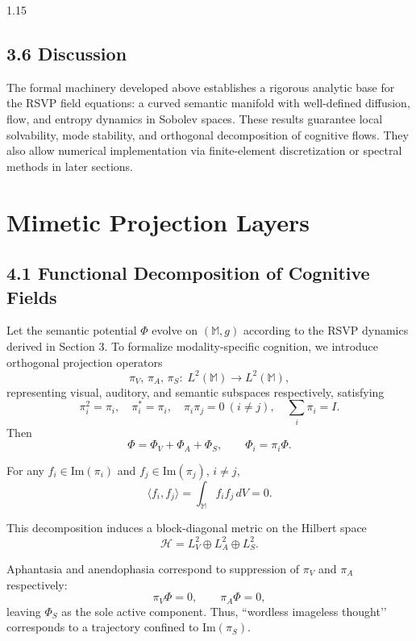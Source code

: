 \documentclass[12pt,a4paper]{article}
\begin{document}
\begin{spacing}{1.15}
\subsection{3.6 Discussion}

The formal machinery developed above establishes a rigorous analytic base for the RSVP field equations:
a curved semantic manifold with well-defined diffusion, flow, and entropy dynamics in Sobolev spaces.
These results guarantee local solvability, mode stability, and orthogonal decomposition of cognitive flows.
They also allow numerical implementation via finite-element discretization or spectral methods in later sections.

\section{Mimetic Projection Layers}

\subsection{4.1 Functional Decomposition of Cognitive Fields}

Let the semantic potential $\Phi$ evolve on $(\mathbb{M},g)$ according to the RSVP dynamics derived in Section 3.  
To formalize modality-specific cognition, we introduce orthogonal projection operators
\[
\pi_V,\,\pi_A,\,\pi_S:\;L^2(\mathbb{M})\rightarrow L^2(\mathbb{M}),
\]
representing visual, auditory, and semantic subspaces respectively, satisfying
\[
\pi_i^2=\pi_i,\quad
\pi_i^\ast=\pi_i,\quad
\pi_i\pi_j=0\ (i\neq j),\quad
\sum_i\pi_i=I.
\]
Then
\begin{equation}
\Phi=\Phi_V+\Phi_A+\Phi_S,\qquad
\Phi_i=\pi_i\Phi.
\label{eq:Phi-decomp}
\end{equation}

\begin{definition}
For any $f_i\in\mathrm{Im}(\pi_i)$ and $f_j\in\mathrm{Im}(\pi_j)$, $i\neq j$,
\[
\langle f_i,f_j\rangle=\int_\mathbb{M}f_i f_j\,dV=0.
\]
\end{definition}

This decomposition induces a block-diagonal metric on the Hilbert space
\[
\mathcal{H}=L^2_V\oplus L^2_A\oplus L^2_S.
\]

Aphantasia and anendophasia correspond to suppression of $\pi_V$ and $\pi_A$ respectively:
\[
\pi_V\Phi=0,\qquad
\pi_A\Phi=0,
\]
leaving $\Phi_S$ as the sole active component.  
Thus, “wordless imageless thought’’ corresponds to a trajectory confined to $\mathrm{Im}(\pi_S)$.


\end{spacing}
\end{document}
